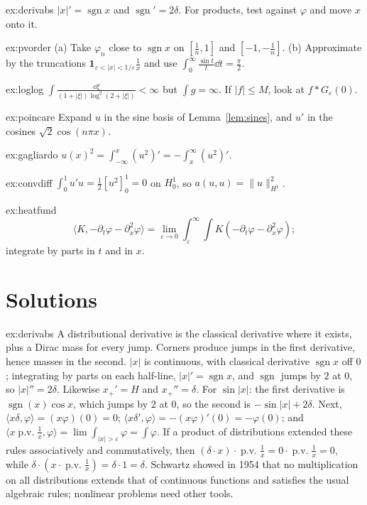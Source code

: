 \begin{hint}{ex:derivabs}
$|x|'=\operatorname{sgn}x$ and $\operatorname{sgn}'=2\delta$. For products, test against $\varphi$ and move $x$ onto it.
\end{hint}
\begin{hint}{ex:pvorder}
(a) Take $\varphi_n$ close to $\operatorname{sgn}x$ on $[\frac1n,1]$ and $[-1,-\frac1n]$. (b) Approximate by the truncations $\mathbf 1_{\varepsilon<|x|<1/\varepsilon}\frac1x$ and use $\int_0^\infty\frac{\sin t}t\dd t=\frac\pi2$.
\end{hint}
\begin{hint}{ex:loglog}
$\int\frac{\dd\xi}{(1+|\xi|)\log^2(2+|\xi|)}<\infty$ but $\int g=\infty$. If $|f|\le M$, look at $f*G_\varepsilon(0)$.
\end{hint}
\begin{hint}{ex:poincare}
Expand $u$ in the sine basis of Lemma~\ref{lem:sines}, and $u'$ in the cosines $\sqrt2\cos(n\pi x)$.
\end{hint}
\begin{hint}{ex:gagliardo}
$u(x)^2=\int_{-\infty}^x(u^2)'=-\int_x^\infty(u^2)'$.
\end{hint}
\begin{hint}{ex:convdiff}
$\int_0^1u'u=\frac12[u^2]_0^1=0$ on $H^1_0$, so $a(u,u)=\|u\|_{H^1}^2$.
\end{hint}
\begin{hint}{ex:heatfund}
\[\langle K,-\partial_t\varphi-\partial_x^2\varphi\rangle=\lim_{\varepsilon\to0}\int_\varepsilon^\infty\!\!\int K(-\partial_t\varphi-\partial_x^2\varphi);\]
integrate by parts in $t$ and in $x$.
\end{hint}

\section{Solutions}

\begin{solution}{ex:derivabs}
\idea A distributional derivative is the classical derivative where it exists, plus a Dirac mass for every jump. Corners produce jumps in the first derivative, hence masses in the second.
\writeup $|x|$ is continuous, with classical derivative $\operatorname{sgn}x$ off $0$; integrating by parts on each half-line, $|x|'=\operatorname{sgn}x$, and $\operatorname{sgn}$ jumps by $2$ at $0$, so $|x|''=2\delta$. Likewise $x_+'=H$ and
$x_+''=\delta$. For $\sin|x|$: the first derivative is $\operatorname{sgn}(x)\cos x$, which jumps by $2$ at $0$, so the second is $-\sin|x|+2\delta$. Next, $\langle x\delta,\varphi\rangle=(x\varphi)(0)=0$;
$\langle x\delta',\varphi\rangle=-(x\varphi)'(0)=-\varphi(0)$; and $\langle x\operatorname{p.v.}\frac1x,\varphi\rangle=\lim\int_{|x|>\varepsilon}\varphi=\int\varphi$. If a product of distributions extended these rules associatively and
commutatively, then $(\delta\cdot x)\cdot\operatorname{p.v.}\frac1x=0\cdot\operatorname{p.v.}\frac1x=0$, while $\delta\cdot(x\cdot\operatorname{p.v.}\frac1x)=\delta\cdot1=\delta$. Schwartz showed in 1954 that no multiplication on all distributions
extends that of continuous functions and satisfies the usual algebraic rules; nonlinear problems need other tools.
\end{solution}

